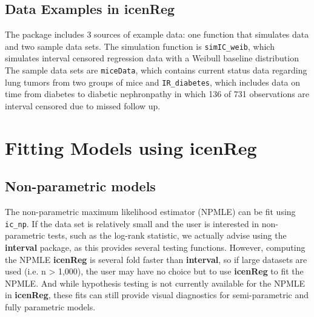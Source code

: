 \documentclass[a4paper]{article}
\begin{document}
  
\subsection{Data Examples in {\bf{icenReg}} }
  
The package includes 3 sources of example data: one function that simulates data and two sample data sets. The simulation function is \texttt{simIC\_weib}, which simulates interval censored regression data with a Weibull baseline distribution The sample data sets are \texttt{miceData}, which contains current status data regarding lung tumors from two groups of mice and \texttt{IR\_diabetes}, which includes data on time from diabetes to diabetic nephronpathy in which 136 of 731 observations are interval censored due to missed follow up. 
  
  
\section{Fitting Models using {\bf{icenReg}} }
  
  
\subsection{Non-parametric models}
  
The non-parametric maximum likelihood estimator (NPMLE) can be fit using \texttt{ic\_np}. If the data set is relatively small and the user is interested in non-parametric tests, such as the log-rank statistic, we actually advise using the {\bf interval} package, as this provides several testing functions. However, computing the NPMLE {\bf icenReg} is several fold faster than {\bf interval}, so if large datasets are used (i.e. n > 1,000), the user may have no choice but to use {\bf icenReg} to fit the NPMLE. And while hypothesis testing is not currently available for the NPMLE in {\bf icenReg}, these fits can still provide visual diagnostics for semi-parametric and fully parametric models. 

\end{document}
